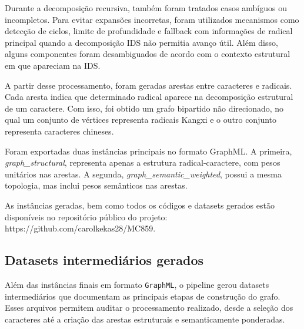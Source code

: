 \documentclass[10pt, a4paper]{extarticle}
\begin{document}
Durante a decomposição recursiva, também foram tratados casos ambíguos ou incompletos. Para evitar expansões incorretas, foram utilizados mecanismos como detecção de ciclos, limite de profundidade e fallback com informações de radical principal quando a decomposição IDS não permitia avanço útil. Além disso, alguns componentes foram desambiguados de acordo com o contexto estrutural em que apareciam na IDS.

A partir desse processamento, foram geradas arestas entre caracteres e radicais. Cada aresta indica que determinado radical aparece na decomposição estrutural de um caractere. Com isso, foi obtido um grafo bipartido não direcionado, no qual um conjunto de vértices representa radicais Kangxi e o outro conjunto representa caracteres chineses.

Foram exportadas duas instâncias principais no formato GraphML. A primeira, \textit{graph\_structural}, representa apenas a estrutura radical-caractere, com pesos unitários nas arestas. A segunda, \textit{graph\_semantic\_weighted}, possui a mesma topologia, mas inclui pesos semânticos nas arestas.

As instâncias geradas, bem como todos os códigos e datasets gerados estão disponíveis no repositório público do projeto: https://github.com/carolkekas28/MC859.

\subsection{Datasets intermediários gerados}
Além das instâncias finais em formato \texttt{GraphML}, o pipeline gerou datasets intermediários que documentam as principais etapas de construção do grafo. Esses arquivos permitem auditar o processamento realizado, desde a seleção dos caracteres até a criação das arestas estruturais e semanticamente ponderadas.
\end{document}
